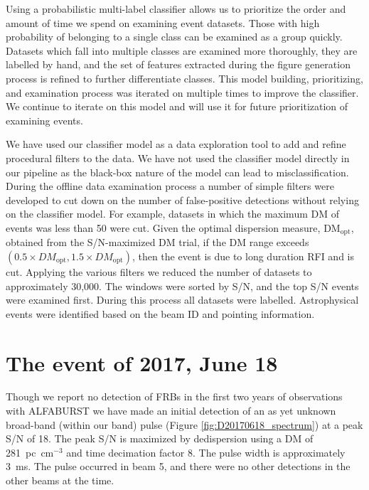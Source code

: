 \documentclass[a4paper,fleqn,usenatbib]{mnras}
\begin{document}
Using a probabilistic multi-label classifier allows us to prioritize the order
and amount of time we spend on examining event datasets. Those with high
probability of belonging to a single class can be examined as a group quickly.
Datasets which fall into multiple classes are examined more thoroughly, they are
labelled by hand, and the set of features extracted during the figure generation
process is refined to further differentiate classes. This model building,
prioritizing, and examination process was iterated on multiple times to improve
the classifier. We continue to iterate on this model and will use it for future
prioritization of examining events.

We have used our classifier model as a data exploration tool to add and refine
procedural filters to the data. We have not used the classifier model directly
in our pipeline as the black-box nature of the model can lead to
misclassification.  During the offline data examination process a number of
simple filters were developed to cut down on the number of false-positive
detections without relying on the classifier model. For example, datasets in
which the maximum DM of events was less than 50 were cut.  Given the optimal
dispersion measure, DM$_{\textrm{opt}}$, obtained from the S/N-maximized DM
trial,  if the DM range exceeds $(0.5 \times DM_{\textrm{opt}}, 1.5 \times
DM_{\textrm{opt}})$, then the event is due to long duration RFI and is cut.
Applying the various filters we reduced the number of datasets to approximately
30,000. The windows were sorted by S/N, and the top S/N events were examined
first.  During this process all datasets were labelled.  Astrophysical events
were identified based on the beam ID and pointing information.


\section{The event of 2017, June 18}
\label{sec:18062017}

Though we report no detection of FRBs in the first two years of observations
with ALFABURST we have made an initial detection of an as yet unknown broad-band
(within our band) pulse (Figure \ref{fig:D20170618_spectrum}) at a peak S/N of
18. The peak S/N is maximized by dedispersion using a DM of 281~pc~cm$^{-3}$ and
time decimation factor 8. The pulse width is approximately 3~ms. The pulse
occurred in beam 5, and there were no other detections in the other beams at the
time.
\end{document}
